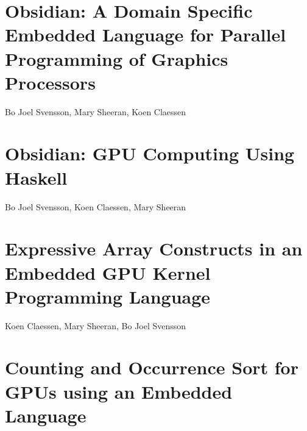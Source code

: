 \documentclass[a4paper]{book}
\begin{document}
\section{Obsidian: A Domain Specific Embedded Language for Parallel Programming of Graphics Processors}

\begin{center} 
Bo Joel Svensson, Mary Sheeran, Koen Claessen
\end{center}



% 
\cleardoublepage 

\section{Obsidian: GPU Computing Using Haskell}

\begin{center} 
Bo Joel Svensson, Koen Claessen, Mary Sheeran
\end{center}




% 
\cleardoublepage 

\section{Expressive Array Constructs in an Embedded GPU Kernel Programming Language}

\begin{center} 
Koen Claessen, Mary Sheeran, Bo Joel Svensson
\end{center}



% 
\cleardoublepage 

\section{Counting and Occurrence Sort for GPUs using an Embedded Language}
\end{document}
